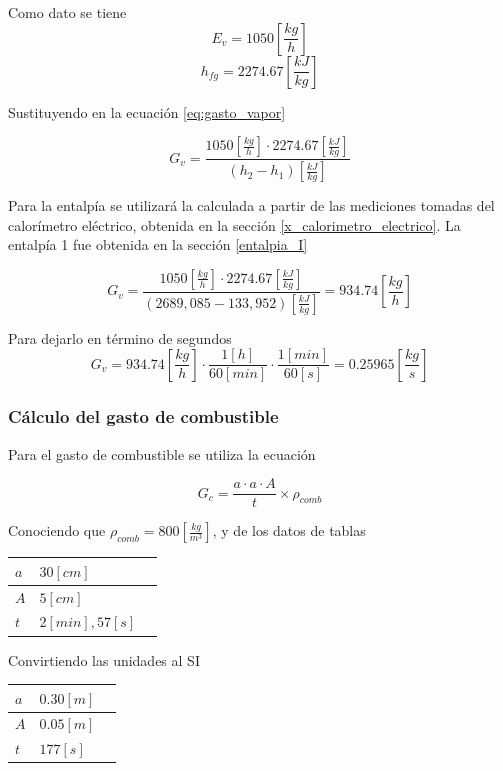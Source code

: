 \documentclass[12pt,letterpaper]{article}
\begin{document}
Como dato se tiene
$$E_v = 1050\left[\frac{kg}{h}\right]$$
$$h_{fg} = 2274.67\left[\frac{kJ}{kg}\right]$$

Sustituyendo en la ecuación \ref{eq:gasto_vapor}

$$
    G_v = \frac{1050\left[\frac{kg}{h}\right] \cdot 2274.67\left[\frac{kJ}{kg}\right] }
    {(h_2 - h_1)\left[\frac{kJ}{kg}\right]}
$$

Para la entalpía se utilizará la calculada a partir de las mediciones tomadas
del calorímetro eléctrico, obtenida en la sección \ref{x_calorimetro_electrico}. 
La entalpía 1 fue obtenida en la sección \ref{entalpia_I}

$$
    G_v = \frac{1050\left[\frac{kg}{h}\right] \cdot 2274.67\left[\frac{kJ}{kg}\right] }
    {(2689,085 - 133,952)\left[\frac{kJ}{kg}\right]} = 934.74\left[\frac{kg}{h}\right]
$$

Para dejarlo en término de segundos
$$
    G_v = 
    934.74\left[\frac{kg}{h}\right] \cdot \frac{1[h]}{60[min]}\cdot \frac{1[min]}{60[s]} 
    = 0.25965\left[\frac{kg}{s}\right]
$$

\subsubsection{Cálculo del gasto de combustible}

Para el gasto de combustible se utiliza la ecuación

\begin{equation}
    G_c = \frac{a\cdot a\cdot A}{t}\times\rho_{comb}
\end{equation}

Conociendo que $\rho_{comb} = 800\left[\frac{kg}{m^3}\right]$, y de los datos de tablas

\begin{tabularx}{0.8\textwidth} { 
  | >{\raggedright\arraybackslash}X 
  | >{\centering\arraybackslash}X 
  | >{\raggedleft\arraybackslash}X | }
 \hline
 $a$ & $30[cm]$  \\
\hline
 $A$ & $5[cm]$  \\
\hline
 $t$ & $2[min], 57[s]$  \\
\hline
\end{tabularx}

Convirtiendo las unidades al SI

\begin{tabularx}{0.8\textwidth} { 
  | >{\raggedright\arraybackslash}X 
  | >{\centering\arraybackslash}X 
  | >{\raggedleft\arraybackslash}X | }
 \hline
 $a$ & $0.30[m]$  \\
\hline
 $A$ & $0.05[m]$  \\
\hline
 $t$ & $177 [s]$  \\
\hline
\end{tabularx}
\end{document}
